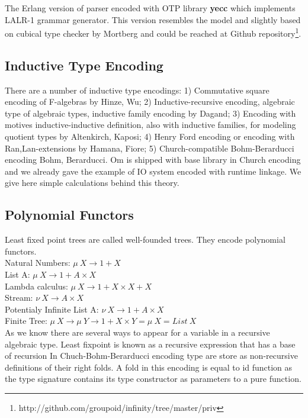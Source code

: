 \documentclass{aip-cp}
\begin{document}
The Erlang version of parser encoded with OTP library {\bf yecc} which implements LALR-1 grammar generator.
This version resembles the model and slightly based on cubical type checker by Mortberg\cite{Mortberg17} and could be reached at Github repository\footnote{http://github.com/groupoid/infinity/tree/master/priv}.

\subsection{Inductive Type Encoding}
There are a number of inductive type encodings:
1) Commutative square encoding of F-algebras by Hinze, Wu\cite{Hinze13}; 
2) Inductive-recursive encoding, algebraic type of algebraic types, inductive family encoding by Dagand\cite{Dagand13};
3) Encoding with motives inductive-inductive definition, also with inductive families, for modeling quotient types by Altenkirch, Kaposi\cite{Kaposi16};
4) Henry Ford encoding or encoding with Ran,Lan-extensions by Hamana, Fiore\cite{Hamana11};
5) Church-compatible Bohm-Berarducci encoding Bohm, Berarducci\cite{Bohm85}. 
Om is shipped with base library in Church encoding and we already gave the example of IO system encoded with runtime linkage.
We give here simple calculations behind this theory.

\subsection{Polynomial Functors}
Least fixed point trees are called well-founded trees.
They encode polynomial functors.\\

\noindent Natural Numbers: $\mu\ X \rightarrow 1 + X$\\
List A: $\mu\ X \rightarrow 1 + A \times X$\\
Lambda calculus: $\mu\ X \rightarrow 1 + X \times X + X$\\
Stream: $\nu\ X \rightarrow A \times X$\\
Potentialy Infinite List A: $\nu\ X \rightarrow 1 + A \times X$\\
Finite Tree: $\mu\ X \rightarrow \mu\ Y \rightarrow 1 + X \times Y = \mu\ X = List\ X$\\

As we know there are several ways to appear for a variable in a recursive algebraic type.
Least fixpoint is known as a recursive expression that has a base of recursion In Chuch-Bohm-Berarducci encoding type are store as non-recursive definitions of their right folds.
A fold in this encoding is equal to id function as the type signature contains its type constructor as parameters to a pure function.
\end{document}
